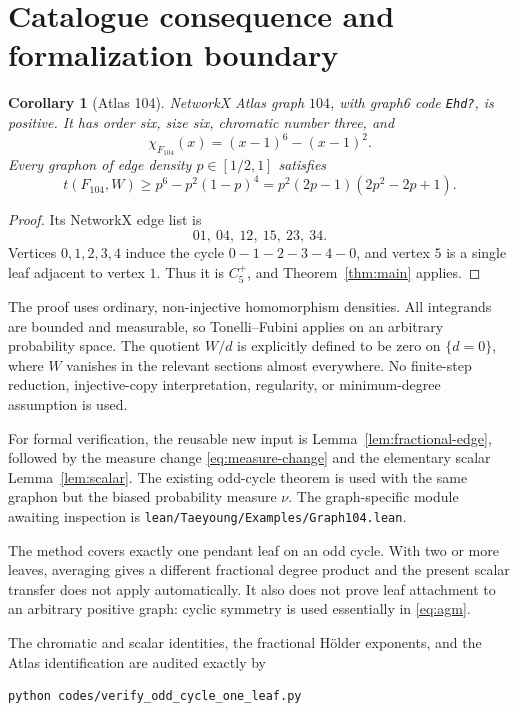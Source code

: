 \documentclass[11pt]{article}
\newtheorem{corollary}[theorem]{Corollary}
\begin{document}
\section{Catalogue consequence and formalization boundary}

\begin{corollary}[Atlas 104]\label{cor:atlas104}
NetworkX Atlas graph $104$, with graph6 code \texttt{Ehd?}, is positive.  It
has order six, size six, chromatic number three, and
\[
 \chi_{F_{104}}(x)=(x-1)^6-(x-1)^2.
\]
Every graphon of edge density $p\in[1/2,1]$ satisfies
\[
 t(F_{104},W)
 \geq p^6-p^2(1-p)^4
 =p^2(2p-1)(2p^2-2p+1).
\]
\end{corollary}

\begin{proof}
Its NetworkX edge list is
\[
 01,\ 04,\ 12,\ 15,\ 23,\ 34.
\]
Vertices $0,1,2,3,4$ induce the cycle
$0-1-2-3-4-0$, and vertex $5$ is a single leaf adjacent to vertex $1$.
Thus it is $C_5^+$, and Theorem~\ref{thm:main} applies.
\end{proof}

The proof uses ordinary, non-injective homomorphism densities.  All
integrands are bounded and measurable, so Tonelli--Fubini applies on an
arbitrary probability space.  The quotient $W/d$ is explicitly defined to
be zero on $\{d=0\}$, where $W$ vanishes in the relevant sections almost
everywhere.  No finite-step reduction, injective-copy interpretation,
regularity, or minimum-degree assumption is used.

For formal verification, the reusable new input is
Lemma~\ref{lem:fractional-edge}, followed by the measure change
\eqref{eq:measure-change} and the elementary scalar Lemma~\ref{lem:scalar}.
The existing odd-cycle theorem is used with the same graphon but the biased
probability measure $\nu$.  The graph-specific module awaiting inspection is
\texttt{lean/Taeyoung/Examples/Graph104.lean}.

The method covers exactly one pendant leaf on an odd cycle.  With two or
more leaves, averaging gives a different fractional degree product and the
present scalar transfer does not apply automatically.  It also does not
prove leaf attachment to an arbitrary positive graph: cyclic symmetry is
used essentially in \eqref{eq:agm}.

The chromatic and scalar identities, the fractional H\"older exponents, and
the Atlas identification are audited exactly by
\begin{verbatim}
python codes/verify_odd_cycle_one_leaf.py
\end{verbatim}
\end{document}
